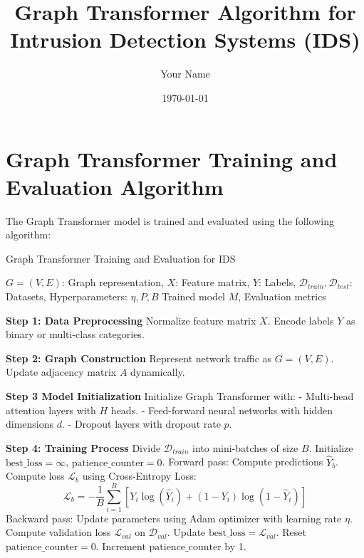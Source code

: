 \documentclass[a4paper]{article}
\title{Graph Transformer Algorithm for Intrusion Detection Systems (IDS)}
\author{Your Name}
\date{\today}
\begin{document}
\maketitle

\section{Graph Transformer Training and Evaluation Algorithm}

The Graph Transformer model is trained and evaluated using the following algorithm:

\begin{algorithm}
\caption{Graph Transformer Training and Evaluation for IDS}\label{alg:graph_transformer}
\begin{algorithmic}[1]
\Require $G = (V, E)$: Graph representation, $X$: Feature matrix, $Y$: Labels, $\mathcal{D}_{train}, \mathcal{D}_{test}$: Datasets, Hyperparameters: $\eta, P, B$
\Ensure Trained model $M$, Evaluation metrics

\State \textbf{Step 1: Data Preprocessing}
    \State Normalize feature matrix $X$. 
    \State Encode labels $Y$ as binary or multi-class categories.

\State \textbf{Step 2: Graph Construction}
    \State Represent network traffic as $G = (V, E)$. 
    \State Update adjacency matrix $A$ dynamically. 

\State \textbf{Step 3 Model Initialization}
    \State Initialize Graph Transformer with:
        \State - Multi-head attention layers with $H$ heads.
        \State - Feed-forward neural networks with hidden dimensions $d$.
        \State - Dropout layers with dropout rate $p$.

\State \textbf{Step 4: Training Process}
    \State Divide $\mathcal{D}_{train}$ into mini-batches of size $B$.
    \State Initialize $ \text{best\_loss} = \infty $, $ \text{patience\_counter} = 0 $.
     
            \State Forward pass: Compute predictions $ \hat{Y}_b $.
            \State Compute loss $ \mathcal{L}_b $ using Cross-Entropy Loss:
                \[
                \mathcal{L}_b = -\frac{1}{B} \sum_{i=1}^{B} \left[ Y_i \log(\hat{Y}_i) + (1 - Y_i) \log(1 - \hat{Y}_i) \right]
                \]
            \State Backward pass: Update parameters using Adam optimizer with learning rate $\eta$.
        \EndFor
        \State Compute validation loss $ \mathcal{L}_{val} $ on $ \mathcal{D}_{val} $.
            \State Update $ \text{best\_loss} = \mathcal{L}_{val} $.
            \State Reset $ \text{patience\_counter} = 0 $.
        \Else
            \State Increment $ \text{patience\_counter} $ by 1.
        \EndIf
    \EndWhile


\end{algorithmic}
\end{algorithm}
\end{document}
